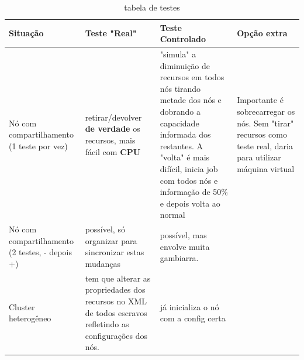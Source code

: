 \begin{table}
	\centering
	\begin{tabular}{|p{2.5cm}|p{4.0cm}|p{6.0cm}|p{2.5cm}|}
		\hline
		Situação & Teste "Real" & Teste Controlado & Opção extra\\
		\hline
		Nó com compartilhamento (1 teste por vez) & retirar/devolver \textbf{de verdade} os recursos, mais fácil com \textbf{CPU} & "simula" a diminuição de recursos em todos nós tirando metade dos nós e dobrando a capacidade informada dos restantes. A "volta" é mais difícil, inicia job com todos nós e informação de 50\% e depois volta ao normal & Importante é sobrecarregar os nós. Sem "tirar" recursos como teste real, daria para utilizar máquina virtual \\
		\hline
		Nó com compartilhamento (2 testes, - depois +) & possível, só organizar para sincronizar estas mudanças & possível, mas envolve muita gambiarra. & \\
		\hline
		Cluster heterogêneo & tem que alterar as propriedades dos recursos no XML de todos escravos refletindo as configurações dos nós. & já inicializa o nó com a config certa & \\
		\hline
		
	\end{tabular}
	\caption{tabela de testes}
	\label{tab:memory allocation}
\end{table}